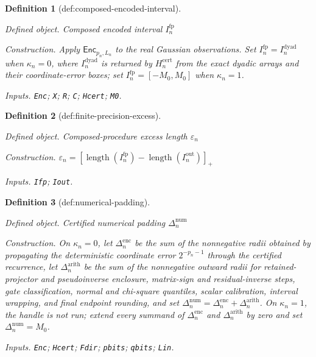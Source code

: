 \documentclass{article}
\newtheorem{definition}{Definition}
\begin{document}
\begin{definition}[def:composed-encoded-interval]\label{def:composed-encoded-interval}
\par\smallskip\noindent\emph{Defined object.} Composed encoded interval \(I_n^{\mathrm{fp}}\)
\par\smallskip\noindent\emph{Construction.} Apply \(\mathsf{Enc}_{p_n,L_n}\) to the real Gaussian observations. Set \(I_n^{\mathrm{fp}}=I_n^{\mathrm{dyad}}\) when \(\kappa_n=0\), where \(I_n^{\mathrm{dyad}}\) is returned by \(H_n^{\mathrm{cert}}\) from the exact dyadic arrays and their coordinate-error boxes; set \(I_n^{\mathrm{fp}}=[-M_0,M_0]\) when \(\kappa_n=1\).
\par\smallskip\noindent\emph{Inputs.} \texttt{Enc}; \texttt{X}; \texttt{R}; \texttt{C}; \texttt{Hcert}; \texttt{M0}.
\end{definition}

\begin{definition}[def:finite-precision-excess]\label{def:finite-precision-excess}
\par\smallskip\noindent\emph{Defined object.} Composed-procedure excess length \(\varepsilon_n\)
\par\smallskip\noindent\emph{Construction.} \(\varepsilon_n=[\operatorname{length}(I_n^{\mathrm{fp}})-\operatorname{length}(I_n^{\mathrm{out}})]_+\)
\par\smallskip\noindent\emph{Inputs.} \texttt{Ifp}; \texttt{Iout}.
\end{definition}

\begin{definition}[def:numerical-padding]\label{def:numerical-padding}
\par\smallskip\noindent\emph{Defined object.} Certified numerical padding \(\Delta_n^{\mathrm{num}}\)
\par\smallskip\noindent\emph{Construction.} On \(\kappa_n=0\), let \(\Delta_n^{\mathrm{enc}}\) be the sum of the nonnegative radii obtained by propagating the deterministic coordinate error \(2^{-p_n-1}\) through the certified recurrence, let \(\Delta_n^{\mathrm{arith}}\) be the sum of the nonnegative outward radii for retained-projector and pseudoinverse enclosure, matrix-sign and residual-inverse steps, gate classification, normal and chi-square quantiles, scalar calibration, interval wrapping, and final endpoint rounding, and set \(\Delta_n^{\mathrm{num}}=\Delta_n^{\mathrm{enc}}+\Delta_n^{\mathrm{arith}}\).  On \(\kappa_n=1\), the handle is not run; extend every summand of \(\Delta_n^{\mathrm{enc}}\) and \(\Delta_n^{\mathrm{arith}}\) by zero and set \(\Delta_n^{\mathrm{num}}=M_0\).
\par\smallskip\noindent\emph{Inputs.} \texttt{Enc}; \texttt{Hcert}; \texttt{Fdir}; \texttt{pbits}; \texttt{qbits}; \texttt{Lin}.
\end{definition}
\end{document}
